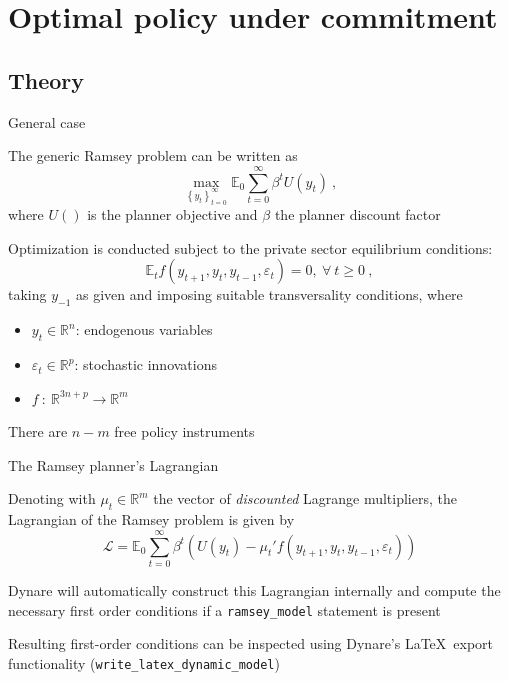 \documentclass[handout,usepdftitle=false,xcolor=dvipsnames,aspectratio=169]{beamer}
\begin{document}
\section{Optimal policy under commitment}

\subsection{Theory}

\begin{frame}{General case}

  \begin{witemize}
    \item  The generic Ramsey problem can be written as
          \begin{equation}
            \max_{\left\{y_t\right\}_{t=0}^\infty} \mathbb{E}_0 \sum_{t=0}^\infty\beta^{t}U(y_t)  \: ,
          \end{equation}
          where $U()$ is the planner objective and $\beta$ the planner discount factor
    \item Optimization is conducted subject to the private sector equilibrium conditions:
          \begin{equation}
            \mathbb{E}_{t}f(y_{t+1}, y_{t}, y_{t-1}, \varepsilon_{t})=0,~\forall \:  t \geq 0 \: ,
          \end{equation}
          taking $y_{-1}$ as given and imposing suitable transversality conditions, where
          \begin{itemize}
            \item $y_t\in \mathbb{R}^n$: endogenous variables
            \item $\varepsilon_t\in \mathbb{R}^p$: stochastic innovations
            \item $f~:~\mathbb{R}^{3n+p} \rightarrow \mathbb{R}^m$
          \end{itemize}
    \item There are $n-m$ free policy instruments
  \end{witemize}
\end{frame}

\begin{frame}{The Ramsey planner's Lagrangian}
  \begin{witemize}
    \item Denoting with $\mu_t \in \mathbb{R}^m$ the vector of \emph{discounted} Lagrange multipliers, the Lagrangian of the Ramsey problem is given by
    \begin{equation}
      \mathcal{L} = \mathbb{E}_0 \sum_{t=0}^\infty\beta^{t} \left( U(y_t) - \mu_t' f(y_{t+1}, y_{t}, y_{t-1}, \varepsilon_{t}) \right)
    \end{equation}
    \item Dynare will automatically construct this Lagrangian internally and compute the necessary first order conditions if a \texttt{ramsey\_model} statement is present
    \item Resulting first-order conditions can be inspected using Dynare's \LaTeX\ export functionality (\texttt{write\_latex\_dynamic\_model})
  \end{witemize}
\end{frame}
\end{document}
